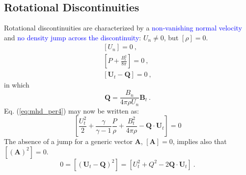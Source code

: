 \documentclass[12pt,a4paper]{article}
\renewcommand{\vec}[1]{\boldsymbol{#1}}
\begin{document}
\subsection{Rotational Discontinuities}
\cite{2015bps..book.....C} Rotational discontinuities are characterized by a \textcolor{blue}{non-vanishing normal velocity} and \textcolor{blue}{no density jump across the discontinuity}: $U_n \neq 0$, but $[\rho] = 0$. 
\begin{align}
\left[U_n \right] = 0 ~, \\
\left[P +\frac{B_t^2}{8\pi} \right] = 0 ~, \label{eq:mhd_per8} \\
\left[ \vec{U}_t -\vec{Q} \right] = 0 ~,
\end{align}
in which
\begin{equation*}
\vec{Q} = \frac{B_n}{4\pi \rho U_n} \vec{B}_t ~.
\end{equation*}
Eq. (\ref{eq:mhd_per4}) may now be written as:
\begin{equation}
\left[\frac{U_t^2}{2} +\frac{\gamma}{\gamma-1}\frac{P}{\rho} +\frac{B_t^2}{4\pi \rho} -\vec{Q} \cdot \vec{U}_t \right] = 0
\end{equation}
The absence of a jump for a generic vector $\vec{A}$, $[\vec{A}]  = 0$, implies also that $[(\vec{A})^2] = 0$.
\begin{equation}
0 = [(\vec{U}_t - \vec{Q})^2] = [U_t^2 +Q^2 -2 \vec{Q} \cdot \vec{U}_t] ~.
\end{equation}
\end{document}
